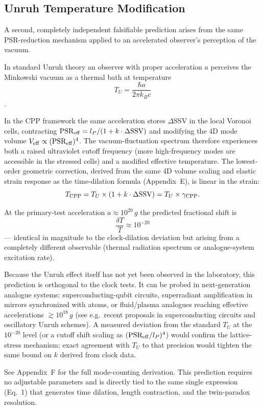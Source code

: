 \documentclass[11pt,letterpaper]{article}
\begin{document}
\subsection{Unruh Temperature Modification}

A second, completely independent falsifiable prediction arises from the same PSR-reduction mechanism applied to an accelerated observer’s perception of the vacuum.

In standard Unruh theory an observer with proper acceleration \(a\) perceives the Minkowski vacuum as a thermal bath at temperature
\[
T_U = \frac{\hbar a}{2\pi k_B c}
\]
\cite{unruh1976}.

In the CPP framework the same acceleration stores \(\Delta\)SSV in the local Voronoi 
cells, contracting \(\text{PSR}_{\rm eff} = l_P / (1 + k \cdot \Delta\text{SSV})\) 
and modifying the 4D mode volume \(V_{\rm eff} \propto (\text{PSR}_{\rm eff})^4\). 
The vacuum-fluctuation spectrum therefore experiences both a raised ultraviolet cutoff 
frequency (more high-frequency modes are accessible in the stressed cells) and a 
modified effective temperature. The lowest-order geometric correction, derived from 
the same 4D volume scaling and elastic strain response as the time-dilation formula 
(Appendix~E), is linear in the strain:
\[
T_{\rm CPP} = T_U \times (1 + k \cdot \Delta\text{SSV}) = T_U \times \gamma_{\rm CPP}.
\]

At the primary-test acceleration \(a \approx 10^{20}\,g\) the predicted fractional shift is
\[
\frac{\delta T}{T} \approx 10^{-20}
\]
— identical in magnitude to the clock-dilation deviation but arising from a completely different observable (thermal radiation spectrum or analogue-system excitation rate).

Because the Unruh effect itself has not yet been observed in the laboratory, this prediction is orthogonal to the clock tests. It can be probed in next-generation analogue systems: superconducting-qubit circuits, superradiant amplification in mirrors synchronized with atoms, or fluid/plasma analogues reaching effective accelerations \(\gtrsim 10^{18}\,g\) (see e.g.\ recent proposals in superconducting circuits and oscillatory Unruh schemes). A measured deviation from the standard \(T_U\) at the \(10^{-20}\) level (or a cutoff shift scaling as \((\text{PSR}_{\rm eff}/l_P)^4\)) would confirm the lattice-stress mechanism; exact agreement with \(T_U\) to that precision would tighten the same bound on \(k\) derived from clock data.

See Appendix~F for the full mode-counting derivation. This prediction requires no adjustable parameters and is directly tied to the same single expression (Eq.~1) that generates time dilation, length contraction, and the twin-paradox resolution.
\end{document}
